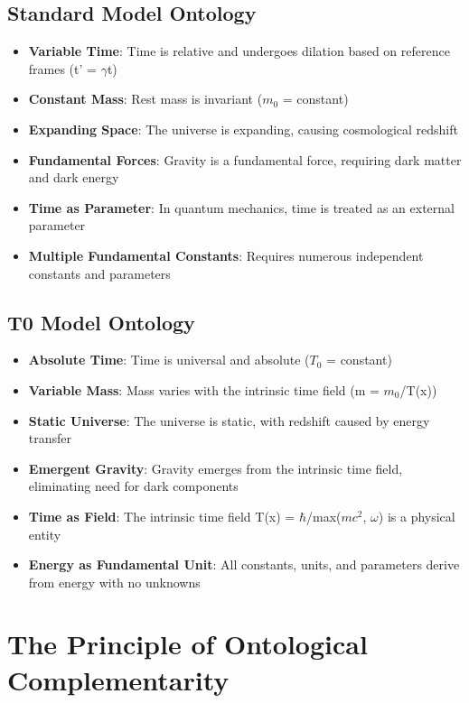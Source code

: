 \documentclass[12pt,a4paper]{article}
\begin{document}
	\subsection{Standard Model Ontology}
	\begin{itemize}
		\item \textbf{Variable Time}: Time is relative and undergoes dilation based on reference frames (t' = $\gamma$t)
		\item \textbf{Constant Mass}: Rest mass is invariant ($m_0$ = constant)
		\item \textbf{Expanding Space}: The universe is expanding, causing cosmological redshift
		\item \textbf{Fundamental Forces}: Gravity is a fundamental force, requiring dark matter and dark energy
		\item \textbf{Time as Parameter}: In quantum mechanics, time is treated as an external parameter
		\item \textbf{Multiple Fundamental Constants}: Requires numerous independent constants and parameters
	\end{itemize}
	
	\subsection{T0 Model Ontology}
	\begin{itemize}
		\item \textbf{Absolute Time}: Time is universal and absolute ($T_0$ = constant)
		\item \textbf{Variable Mass}: Mass varies with the intrinsic time field (m = $m_0$/T(x))
		\item \textbf{Static Universe}: The universe is static, with redshift caused by energy transfer
		\item \textbf{Emergent Gravity}: Gravity emerges from the intrinsic time field, eliminating need for dark components
		\item \textbf{Time as Field}: The intrinsic time field T(x) = $\hbar$/max($mc^2$, $\omega$) is a physical entity
		\item \textbf{Energy as Fundamental Unit}: All constants, units, and parameters derive from energy with no unknowns
	\end{itemize}
	
	\section{The Principle of Ontological Complementarity}
	
\end{document}
